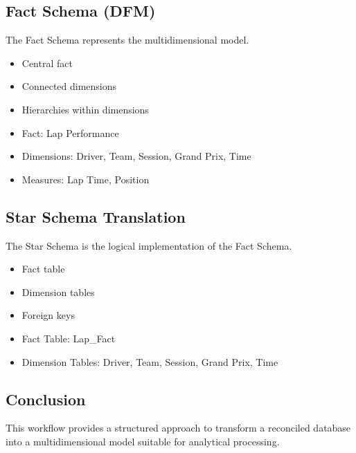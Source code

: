 \documentclass[a4paper,11pt]{article}
\begin{document}
	\subsection{Fact Schema (DFM)}
	
	
	The Fact Schema represents the multidimensional model.
	
	
	\begin{itemize}
		\item Central fact
		\item Connected dimensions
		\item Hierarchies within dimensions
	\end{itemize}
	
	
	\begin{itemize}
		\item Fact: Lap Performance
		\item Dimensions: Driver, Team, Session, Grand Prix, Time
		\item Measures: Lap Time, Position
	\end{itemize}
	
	\subsection{Star Schema Translation}
	
	
	The Star Schema is the logical implementation of the Fact Schema.
	
	
	\begin{itemize}
		\item Fact table
		\item Dimension tables
		\item Foreign keys
	\end{itemize}
	
	
	\begin{itemize}
		\item Fact Table: Lap\_Fact
		\item Dimension Tables: Driver, Team, Session, Grand Prix, Time
	\end{itemize}
	
	\subsection{Conclusion}
	
	This workflow provides a structured approach to transform a reconciled database into a multidimensional model suitable for analytical processing.
	
	
\end{document}

